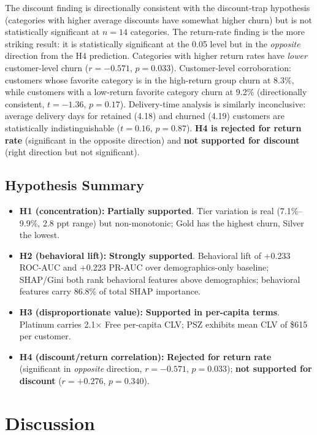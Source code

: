 \documentclass[conference]{IEEEtran}
\begin{document}
The discount finding is directionally consistent with the discount-trap hypothesis (categories with higher average discounts have somewhat higher churn) but is not statistically significant at $n = 14$ categories. The return-rate finding is the more striking result: it is statistically significant at the 0.05 level but in the \emph{opposite} direction from the H4 prediction. Categories with higher return rates have \emph{lower} customer-level churn ($r = -0.571$, $p = 0.033$). Customer-level corroboration: customers whose favorite category is in the high-return group churn at 8.3\%, while customers with a low-return favorite category churn at 9.2\% (directionally consistent, $t = -1.36$, $p = 0.17$). Delivery-time analysis is similarly inconclusive: average delivery days for retained (4.18) and churned (4.19) customers are statistically indistinguishable ($t = 0.16$, $p = 0.87$). \textbf{H4 is rejected for return rate} (significant in the opposite direction) and \textbf{not supported for discount} (right direction but not significant).

\subsection{Hypothesis Summary}

\begin{itemize}
\item \textbf{H1 (concentration):} \textbf{Partially supported}. Tier variation is real (7.1\%--9.9\%, 2.8 ppt range) but non-monotonic; Gold has the highest churn, Silver the lowest.
\item \textbf{H2 (behavioral lift):} \textbf{Strongly supported}. Behavioral lift of +0.233 ROC-AUC and +0.223 PR-AUC over demographics-only baseline; SHAP/Gini both rank behavioral features above demographics; behavioral features carry 86.8\% of total SHAP importance.
\item \textbf{H3 (disproportionate value):} \textbf{Supported in per-capita terms}. Platinum carries 2.1$\times$ Free per-capita CLV; PSZ exhibits mean CLV of \$615 per customer.
\item \textbf{H4 (discount/return correlation):} \textbf{Rejected for return rate} (significant in \emph{opposite} direction, $r = -0.571$, $p = 0.033$); \textbf{not supported for discount} ($r = +0.276$, $p = 0.340$).
\end{itemize}

\section{Discussion}
\end{document}
